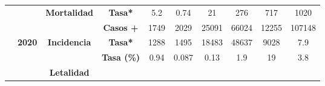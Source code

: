 \begin{tabular}{lccc|cccccc|}
		\multicolumn{1}{l|}{} &
		\multicolumn{1}{c|}{\cellcolor[HTML]{ECF4FF}} &
		\multicolumn{1}{c|}{\multirow{-2}{*}{\cellcolor[HTML]{ECF4FF}\textbf{Mortalidad}}} &
		\cellcolor[HTML]{ECF4FF}\textbf{Tasa*} &
		\multicolumn{1}{c|}{\cellcolor[HTML]{ECF4FF}5.2} &
		\multicolumn{1}{c|}{\cellcolor[HTML]{ECF4FF}0.74} &
		\multicolumn{1}{c|}{\cellcolor[HTML]{ECF4FF}21} &
		\multicolumn{1}{c|}{\cellcolor[HTML]{ECF4FF}276} &
		\multicolumn{1}{c|}{\cellcolor[HTML]{ECF4FF}717} &
		\cellcolor[HTML]{ECF4FF}1020 \\ \cline{3-10} 
		\multicolumn{1}{l|}{} &
		\multicolumn{1}{c|}{\cellcolor[HTML]{ECF4FF}} &
		\multicolumn{1}{c|}{\cellcolor[HTML]{ECF4FF}} &
		\cellcolor[HTML]{ECF4FF}\textbf{Casos +} &
		\multicolumn{1}{c|}{\cellcolor[HTML]{ECF4FF}1749} &
		\multicolumn{1}{c|}{\cellcolor[HTML]{ECF4FF}2029} &
		\multicolumn{1}{c|}{\cellcolor[HTML]{ECF4FF}25091} &
		\multicolumn{1}{c|}{\cellcolor[HTML]{ECF4FF}66024} &
		\multicolumn{1}{c|}{\cellcolor[HTML]{ECF4FF}12255} &
		\cellcolor[HTML]{ECF4FF}107148 \\ \cline{4-10} 
		\multicolumn{1}{l|}{} &
		\multicolumn{1}{c|}{\multirow{-6}{*}{\cellcolor[HTML]{ECF4FF}\textbf{2020}}} &
		\multicolumn{1}{c|}{\multirow{-2}{*}{\cellcolor[HTML]{ECF4FF}\textbf{Incidencia}}} &
		\cellcolor[HTML]{ECF4FF}\textbf{Tasa*} &
		\multicolumn{1}{c|}{\cellcolor[HTML]{ECF4FF}1288} &
		\multicolumn{1}{c|}{\cellcolor[HTML]{ECF4FF}1495} &
		\multicolumn{1}{c|}{\cellcolor[HTML]{ECF4FF}18483} &
		\multicolumn{1}{c|}{\cellcolor[HTML]{ECF4FF}48637} &
		\multicolumn{1}{c|}{\cellcolor[HTML]{ECF4FF}9028} &
		\cellcolor[HTML]{ECF4FF}7.9 \\ \cline{2-10} 
		\multicolumn{1}{l|}{} &
		\multicolumn{1}{c|}{\cellcolor[HTML]{FFFFC7}} &
		\multicolumn{1}{c|}{\cellcolor[HTML]{FFFFC7}} &
		\cellcolor[HTML]{FFFFC7}\textbf{Tasa (\%)} &
		\multicolumn{1}{c|}{\cellcolor[HTML]{FFFFC7}0.94} &
		\multicolumn{1}{c|}{\cellcolor[HTML]{FFFFC7}0.087} &
		\multicolumn{1}{c|}{\cellcolor[HTML]{FFFFC7}0.13} &
		\multicolumn{1}{c|}{\cellcolor[HTML]{FFFFC7}1.9} &
		\multicolumn{1}{c|}{\cellcolor[HTML]{FFFFC7}19} &
		\cellcolor[HTML]{FFFFC7}3.8 \\ \cline{4-10} 
		\multicolumn{1}{l|}{} &
		\multicolumn{1}{c|}{\cellcolor[HTML]{FFFFC7}} &
		\multicolumn{1}{c|}{\multirow{-2}{*}{\cellcolor[HTML]{FFFFC7}\textbf{Letalidad}}} &
		\cellcolor[HTML]{FFFFC7} &
		\multicolumn{1}{c|}{\cellcolor[HTML]{FFFFC7}} &
		\multicolumn{1}{c|}{\cellcolor[HTML]{FFFFC7}} &
		\multicolumn{1}{c|}{\cellcolor[HTML]{FFFFC7}} &
		\multicolumn{1}{c|}{\cellcolor[HTML]{FFFFC7}} &

\end{tabular}
